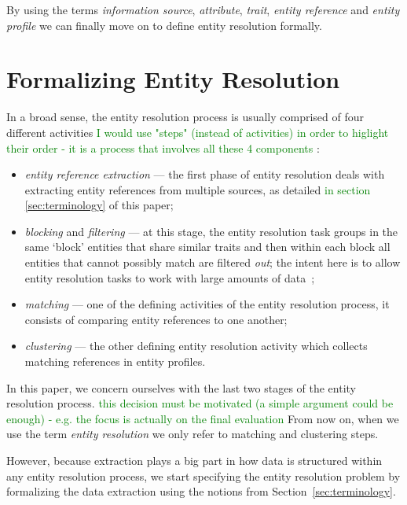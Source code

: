 \documentclass[journal]{IEEEtran}
\begin{document}
    By using the terms \textit{information source}, \textit{attribute},
    \textit{trait}, \textit{entity reference} and \textit{entity profile} we can
    finally move on to define entity resolution formally.

    \section{Formalizing Entity Resolution}\label{sec:entity-resolution}

    In a broad sense, the entity resolution process is usually comprised of four
    different activities\cite{Pap19,Tal11}
    \textcolor{green}{I would use "steps" (instead of activities) in order to higlight their order - it is a process that involves all these 4 components}
    :
    \begin{itemize}
        \item \textit{entity reference extraction} --- the first phase of entity
        resolution deals with extracting entity references from multiple
        sources, as detailed  
        \textcolor{green}{in section \ref{sec:terminology}} 
        of this paper;
        \item \textit{blocking} and \textit{filtering} --- at this stage, the
        entity resolution task groups in the same `block' entities that share
        similar traits and then within each block all entities that cannot
        possibly match are filtered \textit{out}; the intent here is to allow
        entity resolution tasks to work with large amounts of data~\cite{Pap19};
        \item \textit{matching} --- one of the defining activities of the entity
        resolution process, it consists of comparing entity references to one
        another;
        \item \textit{clustering} --- the other defining entity resolution
        activity which collects matching references in entity profiles.
    \end{itemize}

    In this paper, we concern ourselves with the last two stages of the entity
    resolution process.
    \textcolor{green}{this decision must be motivated (a simple argument could be enough) - e.g. the focus is actually on the final evaluation}
    From now on, when we use the term \textit{entity resolution} we only refer
    to matching and clustering steps.

    However, because extraction plays a big part in how data is structured
    within any entity resolution process, we start specifying the entity resolution problem by formalizing the data extraction using the notions from
    Section~\ref{sec:terminology}.
    
\end{document}
